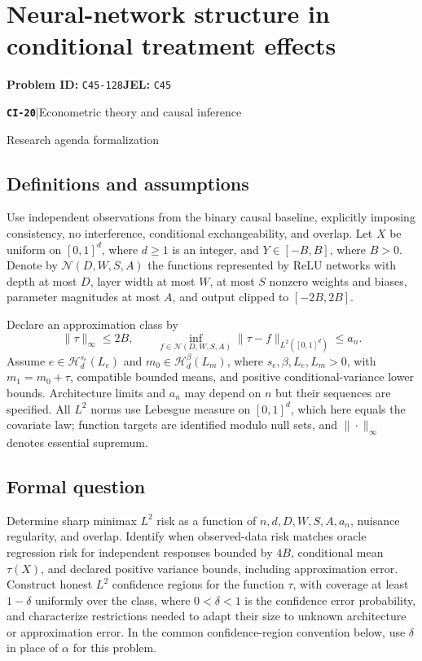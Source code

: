\documentclass[11pt,a4paper]{article}
\newcommand{\entrymeta}[3]{{\sffamily\small\color{muted}\textbf{\texttt{#1}}\quad|\quad #2\par #3\par}}
\begin{document}
\section*{Neural-network structure in conditional treatment effects}
\textbf{Problem ID:} \texttt{C45-128}\quad \textbf{JEL:} \texttt{C45}\par
\label{problem:OP-0499}
\label{beyond:CI-20}
\entrymeta{CI-20}{Econometric theory and causal inference}{Research agenda formalization}
\subsection*{Definitions and assumptions}
Use independent observations from the binary causal baseline, explicitly imposing consistency, no interference, conditional exchangeability, and overlap. Let $X$ be uniform on $[0,1]^d$, where $d\geq1$ is an integer, and $Y\in[-B,B]$, where $B>0$. Denote by $\mathcal N(D,W,S,A)$ the functions represented by ReLU networks with depth at most $D$, layer width at most $W$, at most $S$ nonzero weights and biases, parameter magnitudes at most $A$, and output clipped to $[-2B,2B]$.

Declare an approximation class by
\[
\|\tau\|_\infty\leq2B,\qquad
\inf_{f\in\mathcal N(D,W,S,A)}
 \|\tau-f\|_{L^2([0,1]^d)}\leq a_n.
\]
Assume $e\in\mathcal H_d^{s_e}(L_e)$ and $m_0\in\mathcal H_d^\beta(L_m)$, where $s_e,\beta,L_e,L_m>0$, with $m_1=m_0+\tau$, compatible bounded means, and positive conditional-variance lower bounds. Architecture limits and $a_n$ may depend on $n$ but their sequences are specified. All $L^2$ norms use Lebesgue measure on $[0,1]^d$, which here equals the covariate law; function targets are identified modulo null sets, and $\|\cdot\|_\infty$ denotes essential supremum.
\subsection*{Formal question}
Determine sharp minimax $L^2$ risk as a function of $n,d,D,W,S,A,a_n$, nuisance regularity, and overlap. Identify when observed-data risk matches oracle regression risk for independent responses bounded by $4B$, conditional mean $\tau(X)$, and declared positive variance bounds, including approximation error. Construct honest $L^2$ confidence regions for the function $\tau$, with coverage at least $1-\delta$ uniformly over the class, where $0<\delta<1$ is the confidence error probability, and characterize restrictions needed to adapt their size to unknown architecture or approximation error. In the common confidence-region convention below, use $\delta$ in place of $\alpha$ for this problem.
\end{document}
